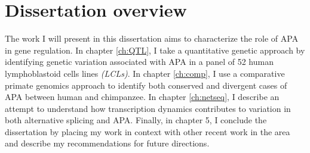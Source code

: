 \section{Dissertation overview} 

The work I will present in this dissertation aims to characterize the role of APA in gene regulation. In chapter \ref{ch:QTL}, I take a quantitative genetic approach by identifying genetic variation associated with APA in a panel of 52 human lymphoblastoid cells lines \emph{(LCLs)}. In chapter \ref{ch:comp}, I use a comparative primate genomics approach to identify both conserved and divergent cases of APA between human and chimpanzee. In chapter \ref{ch:netseq}, I describe an attempt to understand how transcription dynamics contributes to variation in both alternative splicing and APA. Finally, in chapter 5, I conclude the dissertation by placing my work in context with other recent work in the area and describe my recommendations for future directions. 
